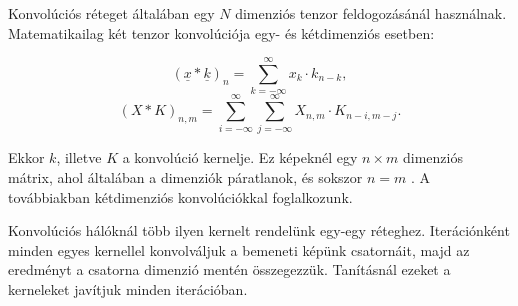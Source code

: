 






Konvolúciós réteget általában egy $ N $ dimenziós tenzor feldogozásánál használnak.
Matematikailag két tenzor konvolúciója egy- és kétdimenziós esetben:



\[  (\underline{x}*\underline{k})_{n} =  \sum\limits_{k=-\infty}^{\infty} x_{k} \cdot k_{n-k} , \]
\[  (X*K)_{n, m} =  
\sum\limits_{i=-\infty}^{\infty}  
\sum\limits_{j=-\infty}^{\infty} 
X_{n, m} \cdot K_{n-i, m-j} . \]



Ekkor $ k $, illetve $ K $ a konvolúció kernelje. Ez képeknél egy $ n \times m $ dimenziós mátrix, ahol általában a dimenziók páratlanok, és sokszor $ n = m $ . A továbbiakban kétdimenziós konvolúciókkal foglalkozunk.


Konvolúciós hálóknál több ilyen kernelt rendelünk egy-egy réteghez.
Iterációnként minden egyes kernellel konvolváljuk a bemeneti képünk csatornáit, majd az eredményt a csatorna dimenzió mentén összegezzük.
Tanításnál ezeket a kerneleket javítjuk minden iterációban.

